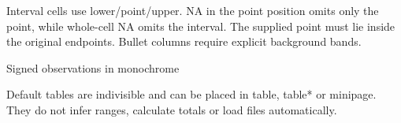 Interval cells use lower/point/upper. NA in the point position omits only the
point, while whole-cell NA omits the interval. The supplied point must lie inside
the original endpoints. Bullet columns require explicit background bands.
\begin{demo}{Signed observations in monochrome}
\begin{center}
\begin{gradtable}[align=c,header align=c,preset=mono,graphic width=32mm,
  text width=19mm,label width=19mm]
\end{gradtable}
\end{center}
\end{demo}
Default tables are indivisible and can be placed in table, table* or minipage.
They do not infer ranges, calculate totals or load files automatically.

\clearpage

